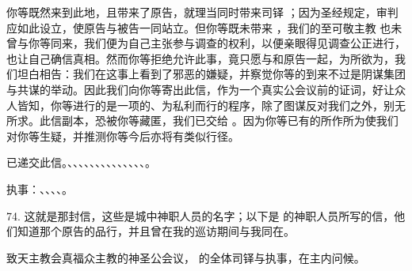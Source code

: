 你等既然来到此地，且带来了原告，就理当同时带来司铎 ；因为圣经规定，审判应如此设立，使原告与被告一同站立。但你等既未带来 ，我们的至可敬主教  也未曾与你等同来，我们便为自己主张参与调查的权利，以便亲眼得见调查公正进行，也让自己确信真相。然而你等拒绝允许此事，竟只愿与和原告一起，为所欲为，我们坦白相告：我们在这事上看到了邪恶的嫌疑，并察觉你等的到来不过是阴谋集团与共谋的举动。因此我们向你等寄出此信，作为一个真实公会议前的证词，好让众人皆知，你等进行的是一项的、为私利而行的程序，除了图谋反对我们之外，别无所求。此信副本，恐被你等藏匿，我们已交给 。因为你等已有的所作所为使我们对你等生疑，并推测你等今后亦将有类似行径。\par

 已递交此信。、、、、、、、、、、、、、、。\par

执事：、、、、。\par

74. 这就是那封信，这些是城中神职人员的名字；以下是  的神职人员所写的信，他们知道那个原告的品行，并且曾在我的巡访期间与我同在。\par

致天主教会真福众主教的神圣公会议， 的全体司铎与执事，在主内问候。\par

